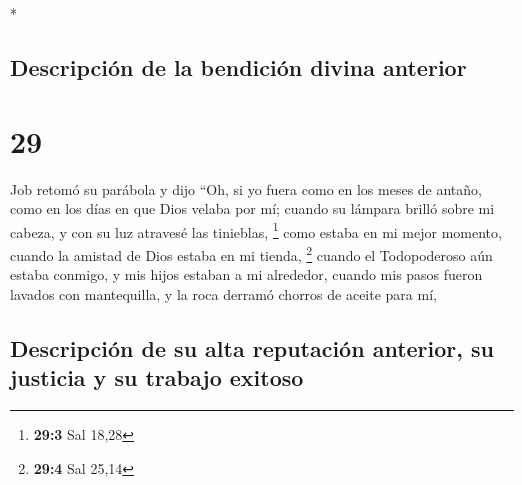 \begin{paracol}{2}
\begin{otherlanguage}{english}
\end{otherlanguage}

\switchcolumn[0]*

\hypertarget{descripciuxf3n-de-la-bendiciuxf3n-divina-anterior}{%
\subsection{Descripción de la bendición divina
anterior}\label{descripciuxf3n-de-la-bendiciuxf3n-divina-anterior}}

\hypertarget{section-56}{%
\section{29}\label{section-56}}

 Job retomó su parábola y dijo  ``Oh, si yo
fuera como en los meses de antaño, como en los días en que Dios velaba
por mí;  cuando su lámpara brilló sobre mi cabeza, y con
su luz atravesé las tinieblas, \footnote{\textbf{29:3} Sal 18,28}
 como estaba en mi mejor momento, cuando la amistad de
Dios estaba en mi tienda, \footnote{\textbf{29:4} Sal 25,14}
 cuando el Todopoderoso aún estaba conmigo, y mis hijos
estaban a mi alrededor,  cuando mis pasos fueron lavados
con mantequilla, y la roca derramó chorros de aceite para mí,

\hypertarget{descripciuxf3n-de-su-alta-reputaciuxf3n-anterior-su-justicia-y-su-trabajo-exitoso}{%
\subsection{Descripción de su alta reputación anterior, su justicia y su
trabajo
exitoso}\label{descripciuxf3n-de-su-alta-reputaciuxf3n-anterior-su-justicia-y-su-trabajo-exitoso}}


\end{paracol}
